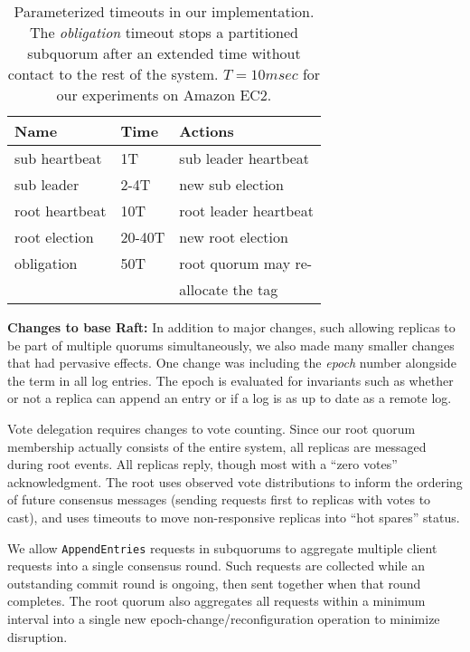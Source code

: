 \renewcommand{\baselinestretch}{1}
\small\normalsize
 \begin{table}[ht]
\caption[Parameterized Timeouts of Raft Implementation]{Parameterized timeouts in our implementation. The \emph{obligation} timeout
  stops a partitioned subquorum after an extended time without contact to the
  rest of the system. $T=10 msec$ for our experiments on Amazon EC2.}
\begin{center}
\begin{tabular}{l|l|l}
\hline
Name & Time & Actions \\
\hline \hline
sub heartbeat& 1T & sub leader heartbeat\\
sub leader & 2-4T & new sub election\\ \hline
root heartbeat & 10T & root leader heartbeat \\
root election & 20-40T & new root election \\ \hline
obligation & 50T & root quorum may re- \\
 &  & allocate the tag \\
\hline
\end{tabular}
\end{center}
\label{tab:ticks}
\end{table}
 \renewcommand{\baselinestretch}{2}
\small\normalsize

\textbf{Changes to base Raft:} In addition to major changes, such allowing
replicas to be part of multiple quorums simultaneously, we also made many
smaller changes that had pervasive effects.
One change was including the \textit{epoch} number alongside the term in all
log entries.
The epoch is evaluated for invariants such as whether or not a replica can
append an entry or if a log is as up to date as a remote log.

Vote delegation requires changes to vote counting.
Since our root quorum membership actually consists of the entire system, all replicas
are messaged during root events.
All replicas reply, though most with a ``zero votes'' acknowledgment.
The root uses observed vote distributions to inform the ordering of future
consensus messages (sending requests first to replicas with votes to cast),
and uses timeouts to move non-responsive replicas into ``hot spares'' status.

We allow \texttt{AppendEntries} requests in subquorums to aggregate multiple client
requests into a single consensus round.
Such requests are collected while an outstanding commit round is ongoing, then
sent together when that round completes.
The root quorum also aggregates all requests within a minimum interval into a single
new epoch-change/reconfiguration operation to minimize disruption.

